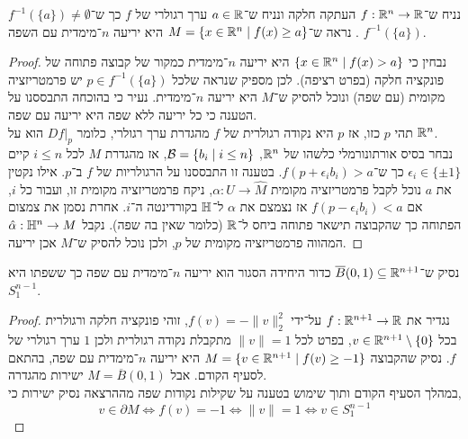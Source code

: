 \question{}
\subquestion{}
נניח ש־$f : \mathbb{R}^n \to \mathbb{R}$ העתקה חלקה ונניח ש־$a \in \mathbb{R}$ ערך רגולרי של $f$ כך ש־$f^{-1}(\{ a \}) \ne \emptyset$.
נראה ש־$M = \{ x \in \mathbb{R}^n \mid f(x) \ge a \}$ היא יריעה $n$־מימדית עם השפה $f^{-1}(\{ a \})$.
\begin{proof}
	נבחין כי $\{ x \in \mathbb{R}^n \mid f(x) > a \}$ היא יריעה $n$־מימדית כמקור של קבוצה פתוחה של פונקציה חלקה (בפרט רציפה).
	לכן מספיק שנראה שלכל $p \in f^{-1}(\{ a \})$ יש פרמטריזציה מקומית (עם שפה) ונוכל להסיק ש־$M$ היא יריעה $n$־מימדית.
	נעיר כי בהוכחה התבססנו על הטענה כי כל יריעה ללא שפה היא יריעה עם שפה. \\
	תהי $p$ כזו, אז $p$ היא נקודה רגולרית של $f$ מהגדרת ערך רגולרי, כלומר $D f |_p$ הוא על $\mathbb{R}^n$. \\
	נבחר בסיס אורתונורמלי כלשהו של $\mathbb{R}^n$, $\mathcal{B} = \{ b_i \mid i \le n \}$, אז מהגדרת $M$ לכל $i \le n$ קיים $\epsilon_i \in \{ \pm 1 \}$ כך ש־$f(p + \epsilon_i b_i) > a$.
	בטענה זו התבססנו על הרגולריות של $f$ ב־$p$.
	אילו נקטין את $a$ נוכל לקבל פרמטריזציה מקומית $\alpha : U \to \hat{M}$, ניקח פרמטריזציה מקומית זו, ועבור כל $i$, אם $f(p - \epsilon_i b_i) < a$ אז נצמצם את $\alpha$ ל־$\mathbb{H}$ בקורדינטה ה־$i$.
	אחרת נסמן את צמצום הפתוחה כך שהקבוצה תישאר פתוחה ביחס ל־$\mathbb{R}$ (כלומר שאין בה שפה).
	נקבל $\hat{\alpha} : \mathbb{H}^n \to M$ המהווה פרמטריזציה מקומית של $p$, ולכן נוכל להסיק ש־$M$ אכן יריעה.
\end{proof}

\subquestion{}
נסיק ש־$\overline{B}(0, 1) \subseteq \mathbb{R}^{n + 1}$ כדור היחידה הסגור הוא יריעה $n$־מימדית עם שפה כך ששפתו היא $S_1^{n - 1}$.
\begin{proof}
	נגדיר את $f : \mathbb{R}^{n + 1} \to \mathbb{R}$ על־ידי $f(v) = -\lVert v \rVert_2^2$,
	זוהי פונקציה חלקה ורגולרית בכל $v \in \mathbb{R}^{n + 1} \setminus \{ 0 \}$, בפרט לכל $\lVert v \rVert = 1$ מתקבלת נקודה רגולרית ולכן $1$ ערך רגולרי של $f$.
	נסיק שהקבוצה $M = \{ v \in \mathbb{R}^{n + 1} \mid f(v) \ge -1 \}$ היא יריעה $n$־מימדית עם שפה, בהתאם לסעיף הקודם.
	אבל $M = \overline{B}(0, 1)$ ישירות מהגדרה. \\
	במהלך הסעיף הקודם ותוך שימוש בטענה על שקילות נקודות שפה מההרצאה נסיק ישירות כי,
	\[
		v \in \partial M \iff f(v) = -1 \iff \lVert v \rVert = 1 \iff v \in S_1^{n - 1}
	\]
\end{proof}

